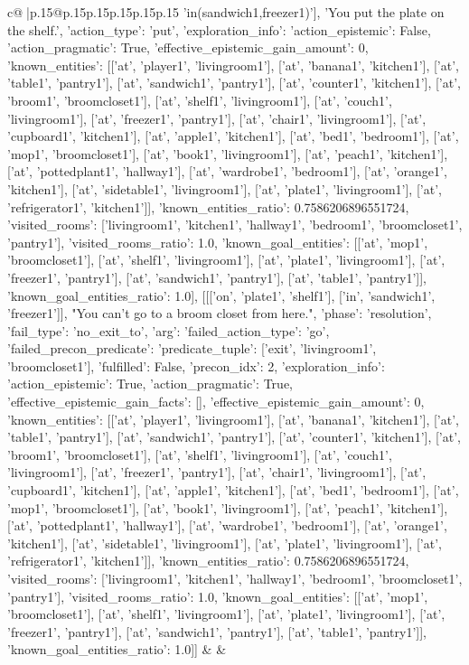 \documentclass{article}
\begin{document}
{\begin{supertabular}{c@{$\;$}|p{.15\linewidth}@{}p{.15\linewidth}p{.15\linewidth}p{.15\linewidth}p{.15\linewidth}p{.15\linewidth}}
{{{'in(sandwich1,freezer1)'], 'You put the plate on the shelf.', {'action_type': 'put', 'exploration_info': {'action_epistemic': False, 'action_pragmatic': True, 'effective_epistemic_gain_amount': 0, 'known_entities': [['at', 'player1', 'livingroom1'], ['at', 'banana1', 'kitchen1'], ['at', 'table1', 'pantry1'], ['at', 'sandwich1', 'pantry1'], ['at', 'counter1', 'kitchen1'], ['at', 'broom1', 'broomcloset1'], ['at', 'shelf1', 'livingroom1'], ['at', 'couch1', 'livingroom1'], ['at', 'freezer1', 'pantry1'], ['at', 'chair1', 'livingroom1'], ['at', 'cupboard1', 'kitchen1'], ['at', 'apple1', 'kitchen1'], ['at', 'bed1', 'bedroom1'], ['at', 'mop1', 'broomcloset1'], ['at', 'book1', 'livingroom1'], ['at', 'peach1', 'kitchen1'], ['at', 'pottedplant1', 'hallway1'], ['at', 'wardrobe1', 'bedroom1'], ['at', 'orange1', 'kitchen1'], ['at', 'sidetable1', 'livingroom1'], ['at', 'plate1', 'livingroom1'], ['at', 'refrigerator1', 'kitchen1']], 'known_entities_ratio': 0.7586206896551724, 'visited_rooms': ['livingroom1', 'kitchen1', 'hallway1', 'bedroom1', 'broomcloset1', 'pantry1'], 'visited_rooms_ratio': 1.0, 'known_goal_entities': [['at', 'mop1', 'broomcloset1'], ['at', 'shelf1', 'livingroom1'], ['at', 'plate1', 'livingroom1'], ['at', 'freezer1', 'pantry1'], ['at', 'sandwich1', 'pantry1'], ['at', 'table1', 'pantry1']], 'known_goal_entities_ratio': 1.0}}], [[['on', 'plate1', 'shelf1'], ['in', 'sandwich1', 'freezer1']], "You can't go to a broom closet from here.", {'phase': 'resolution', 'fail_type': 'no_exit_to', 'arg': {'failed_action_type': 'go', 'failed_precon_predicate': {'predicate_tuple': ['exit', 'livingroom1', 'broomcloset1'], 'fulfilled': False, 'precon_idx': 2}}, 'exploration_info': {'action_epistemic': True, 'action_pragmatic': True, 'effective_epistemic_gain_facts': [], 'effective_epistemic_gain_amount': 0, 'known_entities': [['at', 'player1', 'livingroom1'], ['at', 'banana1', 'kitchen1'], ['at', 'table1', 'pantry1'], ['at', 'sandwich1', 'pantry1'], ['at', 'counter1', 'kitchen1'], ['at', 'broom1', 'broomcloset1'], ['at', 'shelf1', 'livingroom1'], ['at', 'couch1', 'livingroom1'], ['at', 'freezer1', 'pantry1'], ['at', 'chair1', 'livingroom1'], ['at', 'cupboard1', 'kitchen1'], ['at', 'apple1', 'kitchen1'], ['at', 'bed1', 'bedroom1'], ['at', 'mop1', 'broomcloset1'], ['at', 'book1', 'livingroom1'], ['at', 'peach1', 'kitchen1'], ['at', 'pottedplant1', 'hallway1'], ['at', 'wardrobe1', 'bedroom1'], ['at', 'orange1', 'kitchen1'], ['at', 'sidetable1', 'livingroom1'], ['at', 'plate1', 'livingroom1'], ['at', 'refrigerator1', 'kitchen1']], 'known_entities_ratio': 0.7586206896551724, 'visited_rooms': ['livingroom1', 'kitchen1', 'hallway1', 'bedroom1', 'broomcloset1', 'pantry1'], 'visited_rooms_ratio': 1.0, 'known_goal_entities': [['at', 'mop1', 'broomcloset1'], ['at', 'shelf1', 'livingroom1'], ['at', 'plate1', 'livingroom1'], ['at', 'freezer1', 'pantry1'], ['at', 'sandwich1', 'pantry1'], ['at', 'table1', 'pantry1']], 'known_goal_entities_ratio': 1.0}}]] 
	  } 
	   } 
	   } 
	 & & \\ 
 


\end{supertabular}}
\end{document}
